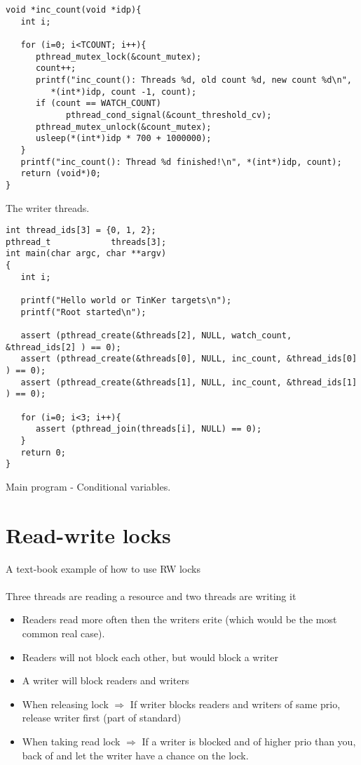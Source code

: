 \begin{table}[!hbp]
\begin{verbatim}
void *inc_count(void *idp){
   int i;

   for (i=0; i<TCOUNT; i++){
      pthread_mutex_lock(&count_mutex);
      count++;
      printf("inc_count(): Threads %d, old count %d, new count %d\n",
         *(int*)idp, count -1, count);
      if (count == WATCH_COUNT)
            pthread_cond_signal(&count_threshold_cv);
      pthread_mutex_unlock(&count_mutex);
      usleep(*(int*)idp * 700 + 1000000);
   }
   printf("inc_count(): Thread %d finished!\n", *(int*)idp, count);
   return (void*)0;
} 
\end{verbatim}
\caption{The writer threads.\label{cond_writer}}
\end{table}

\begin{table}[!hbp]
\begin{verbatim}
int thread_ids[3] = {0, 1, 2};
pthread_t            threads[3]; 
int main(char argc, char **argv)
{ 
   int i;

   printf("Hello world or TinKer targets\n");
   printf("Root started\n");

   assert (pthread_create(&threads[2], NULL, watch_count, &thread_ids[2] ) == 0);
   assert (pthread_create(&threads[0], NULL, inc_count, &thread_ids[0] ) == 0);
   assert (pthread_create(&threads[1], NULL, inc_count, &thread_ids[1] ) == 0);

   for (i=0; i<3; i++){
      assert (pthread_join(threads[i], NULL) == 0);
   }      
   return 0;   
}
\end{verbatim}
\caption{Main program - Conditional variables.\label{cond_main}}
\end{table}

\chapter{Read-write locks}
A text-book example of how to use RW locks
\\\\
Three threads are reading a resource and two threads are writing it

\begin{itemize}
	\item Readers read more often then the writers erite (which would be the most common real case).
	\item Readers will not block each other, but would block a writer
	\item A writer will block readers and writers
	\item When releasing lock $\Rightarrow$ If writer blocks readers and writers of same prio, release writer first (part of standard)
	\item When taking read lock $\Rightarrow$ If a writer is blocked and of higher prio than you, back of and let the writer have a chance on the lock.
\end{itemize}

